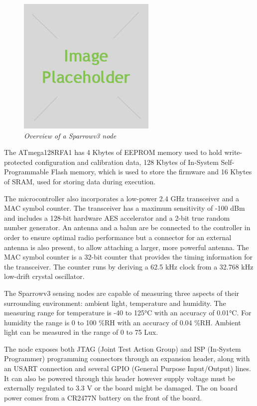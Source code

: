 \begin{figure}[ht]
	\begin{center}
		\includegraphics{img/placeholder.jpg}
	\end{center}
	\caption{\small \itshape{Overview of a Sparrowv3 node}}
\end{figure}

The \mbox{ATmega128RFA1} has 4 Kbytes of EEPROM memory used to hold
write-protected configuration and calibration data, 128 Kbytes of In-System
Self-Programmable Flash memory, which is used to store the firmware and 16
Kbytes of SRAM, used for storing data during execution.

The microcontroller also incorporates a low-power 2.4 GHz transceiver and a MAC
symbol counter. The transceiver has a maximum sensitivity of -100 dBm and
includes a 128-bit hardware AES accelerator and a 2-bit true random number
generator. An antenna and a balun are be connected to the controller in order
to ensure optimal radio performance but a connector for an external antenna is
also present, to allow attaching a larger, more powerful antenna. The MAC
symbol counter is a 32-bit counter that provides the timing information for the
transceiver. The counter runs by deriving a 62.5 kHz clock from a 32.768 kHz
low-drift crystal oscillator. 

The Sparrowv3 sensing nodes are capable of measuring three aspects of their
surrounding environment: ambient light, temperature and humidity. The measuring
range for temperature is -40 to 125°C with an accuracy of 0.01°C. For humidity
the range is 0 to 100 \%RH with an accuracy of 0.04 \%RH. Ambient light can be
measured in the range of 0 to 75 Lux.

The node exposes both JTAG (Joint Test Action Group) and ISP (In-System
Programmer) programming connectors through an expansion header, along with an
USART connection and several GPIO (General Purpose Input/Output) lines. It can
also be powered through this header however supply voltage must be externally
regulated to 3.3 V or the board might be damaged.  The on board power comes
from a CR2477N battery on the front of the board.

